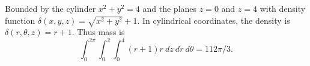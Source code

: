 {
Bounded by the cylinder $x^2+y^2=4$ and the planes $z=0$ and $z=4$ with density function $\delta(x,y,z) =\sqrt{x^2+y^2}+1$. 
\label{ex:13_07_ex_23} 
}
{In cylindrical coordinates, the density is $\delta(r,\theta,z) = r+1$. Thus mass is
$$\int_0^{2\pi}\int_0^2\int_0^4 (r+1)r\ dz\ dr\ d\theta = 112\pi/3.$$
}
